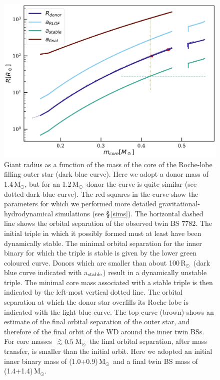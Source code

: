 \documentclass{aastex62}
\newcommand{\MSun}{\mbox{M$_\odot$}}
\newcommand{\RSun}{\mbox{R$_\odot$}}
\def\apgt{\ {\raise-.5ex\hbox{$\buildrel>\over\sim$}}\ }
\begin{document}
\begin{figure}[ht!]
  \includegraphics[width=\columnwidth]{fig_M14MSun_outerorbit.pdf}
  \caption{Giant radius as a function of the mass of the core of the
    Roche-lobe filling outer star (dark blue curve).  Here we adopt
    a donor mass of 1.4\,\MSun, but for an 1.2\,\MSun\, donor the curve is
    quite similar (see dotted dark-blue curve).  The red squares in
    the curve show the parameters for which we performed more detailed
    gravitational-hydrodynamical simulations (see \S\,\ref{sims}).
    The horizontal dashed line shows the orbital separation of the
    observed twin BS 7782.  The initial triple in which it
    possibly formed must at least have been dynamically stable. The
    minimal orbital separation for the inner binary for which the
    triple is stable is given by the lower green coloured curve.
    Donors which are smaller than about 100\,\RSun\, (dark blue curve
    indicated with a$_{\rm stable}$) result in a dynamically unstable
    triple. The minimal core mass associated with a stable triple is
    then indicated by the left-most vertical dotted line.  The
    orbital separation at which the donor star overfills its Roche
    lobe is indicated with the light-blue curve. The top curve (brown)
    shows an estimate of the final orbital separation of the outer star,
    and therefore of the final orbit of the WD around the
    inner twin BSs.  For core masses $\apgt 0.5$\,\MSun\,
    the final orbital separation, after mass transfer, is smaller
    than the initial orbit.  Here we adopted an initial inner binary
    mass of (1.0+0.9)\,\MSun\, and a final twin BS mass of
    (1.4+1.4)\,\MSun.
\label{fig:tertiarymass_vs_size}}
\end{figure}
\end{document}

